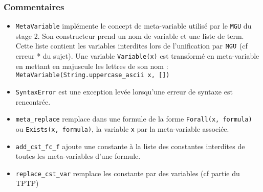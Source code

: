 \documentclass[12pt]{article}
\begin{document}
\subsubsection*{Commentaires}
\begin{itemize}
\item \verb?MetaVariable? implémente le concept de meta-variable utilisé par le \verb?MGU? du stage 2. Son constructeur prend un nom de variable et une liste de term. Cette liste contient les variables interdites lors de l'unification par $\verb?MGU?$ (cf erreur * du sujet). Une variable \verb?Variable(x)? est transformé en meta-variable en mettant en majuscule les lettres de son nom :\\ \verb?MetaVariable(String.uppercase_ascii x, [])?
\item \verb?SyntaxError? est une exception levée lorsqu'une erreur de syntaxe est rencontrée.
\item \verb?meta_replace? remplace dans une formule de la forme \verb?Forall(x, formula)? ou \verb?Exists(x, formula)?, la variable \verb?x? par la meta-variable associée.
\item \verb?add_cst_fc_f? ajoute une constante à la liste des constantes interdites de toutes les meta-variables d'une formule.
\item \verb?replace_cst_var? remplace les constante par des variables (cf partie du TPTP)
\end{itemize}
\end{document}
